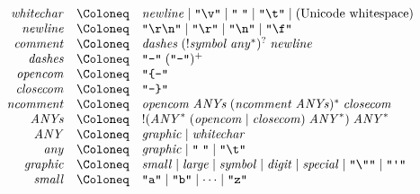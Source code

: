 \begin{align*}
  \begin{array}{rcl}
    \mathit{whitechar}
    & \Coloneq & \mathit{newline}
    \mid \text{\texttt{\textquotedbl\textbackslash v\textquotedbl}}
    \mid \text{\texttt{\textquotedbl\;\textquotedbl}}
    \mid \text{\texttt{\textquotedbl\textbackslash t\textquotedbl}}
    \mid (\text{Unicode whitespace})
    \\
    \mathit{newline}
    & \Coloneq & \text{\texttt{\textquotedbl\textbackslash r\textbackslash n\textquotedbl}}
    \mid \text{\texttt{\textquotedbl\textbackslash r\textquotedbl}}
    \mid \text{\texttt{\textquotedbl\textbackslash n\textquotedbl}}
    \mid \text{\texttt{\textquotedbl\textbackslash f\textquotedbl}}
    \\
    \mathit{comment}
    & \Coloneq & \mathit{dashes}\; (! \mathit{symbol}\; \mathit{any}^*)^?\; \mathit{newline}
    \\
    \mathit{dashes}
    & \Coloneq & \text{\texttt{\textquotedbl-\textquotedbl}}\; (\text{\texttt{\textquotedbl-\textquotedbl}})^+
    \\
    \mathit{opencom}
    & \Coloneq & \text{\texttt{\textquotedbl\{-\textquotedbl}}
    \\
    \mathit{closecom}
    & \Coloneq & \text{\texttt{\textquotedbl-\}\textquotedbl}}
    \\
    \mathit{ncomment}
    & \Coloneq & \mathit{opencom}\; \mathit{ANYs}\; (\mathit{ncomment}\; \mathit{ANYs})^*\; \mathit{closecom}
    \\
    \mathit{ANYs}
    & \Coloneq & ! (\mathit{ANY}^*\; (\mathit{opencom} \mid \mathit{closecom})\; \mathit{ANY}^*)\; \mathit{ANY}^*
    \\
    \mathit{ANY}
    & \Coloneq & \mathit{graphic}
    \mid \mathit{whitechar}
    \\
    \mathit{any}
    & \Coloneq & \mathit{graphic}
    \mid \text{\texttt{\textquotedbl\;\textquotedbl}}
    \mid \text{\texttt{\textquotedbl\textbackslash t\textquotedbl}}
    \\
    \mathit{graphic}
    & \Coloneq & \mathit{small}
    \mid \mathit{large}
    \mid \mathit{symbol}
    \mid \mathit{digit}
    \mid \mathit{special}
    \mid \text{\texttt{\textquotedbl\textbackslash\textquotedbl\textquotedbl}}
    \mid \text{\texttt{\textquotedbl\textquotesingle\textquotedbl}}
    \\
    \mathit{small}
    & \Coloneq & \text{\texttt{\textquotedbl a\textquotedbl}} \mid \text{\texttt{\textquotedbl b\textquotedbl}} \mid \cdots \mid \text{\texttt{\textquotedbl z\textquotedbl}}

\end{array}
\end{align*}
